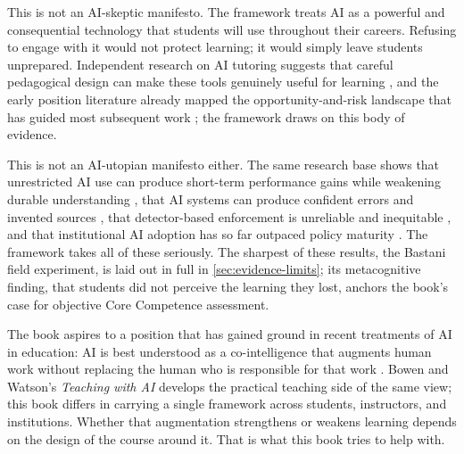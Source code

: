 \documentclass{SIAMbook2023}
\begin{document}
\begin{thepreface}
This is not an AI-skeptic manifesto. The framework treats AI as a powerful and consequential technology that students will use throughout their careers. Refusing to engage with it would not protect learning; it would simply leave students unprepared. Independent research on AI tutoring suggests that careful pedagogical design can make these tools genuinely useful for learning \citep{kestin2025ai,mollick2023assigning}, and the early position literature already mapped the opportunity-and-risk landscape that has guided most subsequent work \citep{kasneci2023chatgpt}; the framework draws on this body of evidence.

This is not an AI-utopian manifesto either. The same research base shows that unrestricted AI use can produce short-term performance gains while weakening durable understanding \citep{bastani2025generative}, that AI systems can produce confident errors and invented sources \citep{bender2021dangers,walters2023fabrication}, that detector-based enforcement is unreliable and inequitable \citep{liang2023gpt}, and that institutional AI adoption has so far outpaced policy maturity \citep{aaup2025artificial}. The framework takes all of these seriously. The sharpest of these results, the Bastani field experiment, is laid out in full in \cref{sec:evidence-limits}; its metacognitive finding, that students did not perceive the learning they lost, anchors the book's case for objective Core Competence assessment.

The book aspires to a position that has gained ground in recent treatments of AI in education: AI is best understood as a co-intelligence that augments human work without replacing the human who is responsible for that work \citep{mollick2024cointelligence}. Bowen and Watson's \emph{Teaching with AI} \citep{bowen2024teaching} develops the practical teaching side of the same view; this book differs in carrying a single framework across students, instructors, and institutions. Whether that augmentation strengthens or weakens learning depends on the design of the course around it. That is what this book tries to help with.

\newpage


\end{thepreface}

\mainmatter
\end{document}
